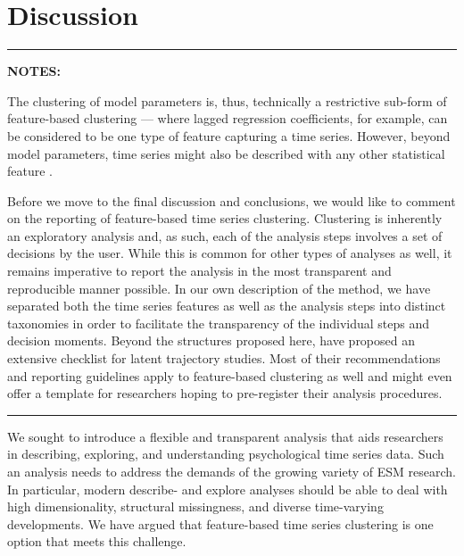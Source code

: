 \documentclass[man, 12pt, a4paper, mask, floatsintext]{apa7}
\theoremstyle{break}
\theoremstyle{plain}
\begin{document}


\section{Discussion}

\begin{center}
\rule{0.4\textwidth}{.4pt}
\end{center}

\textbf{NOTES:}

The clustering of model parameters is, thus, technically a restrictive sub-form of feature-based clustering --- where lagged regression coefficients, for example, can be considered to be one type of feature capturing a time series. However, beyond model parameters, time series might also be described with any other statistical feature \citep{tiano2021}. 

Before we move to the final discussion and conclusions, we would like to comment on the reporting of feature-based time series clustering. Clustering is inherently an exploratory analysis and, as such, each of the analysis steps involves a set of decisions by the user. While this is common for other types of analyses as well, it remains imperative to report the analysis in the most transparent and reproducible manner possible. In our own description of the method, we have separated both the time series features as well as the analysis steps into distinct taxonomies in order to facilitate the transparency of the individual steps and decision moments. Beyond the structures proposed here, \citet{vandeschoot2017} have proposed an extensive checklist for latent trajectory studies. Most of their recommendations and reporting guidelines apply to feature-based clustering as well and might even offer a template for researchers hoping to pre-register their analysis procedures.

\begin{center}
\rule{0.4\textwidth}{.4pt}
\end{center}

We sought to introduce a flexible and transparent analysis that aids researchers in describing, exploring, and understanding psychological time series data. Such an analysis needs to address the demands of the growing variety of ESM research. In particular, modern describe- and explore analyses should be able to deal with high dimensionality, structural missingness, and diverse time-varying developments. We have argued that feature-based time series clustering is one option that meets this challenge. 
\end{document}
